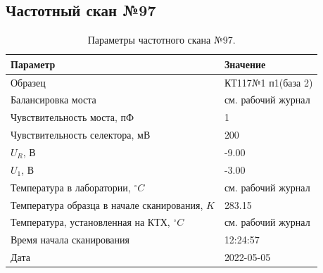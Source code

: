 \subsection{Частотный скан №97}
\begin{table}[!ht]
    \centering
    \caption{Параметры частотного скана №97.}
    \begin{tabular}{|l|l|}
        \hline
        Параметр                                       & Значение                  \\ \hline
        Образец                                        & КТ117№1 п1(база 2)        \\ \hline
        Балансировка моста                             & см. рабочий журнал        \\ \hline
        Чувствительность моста, пФ                     & 1                         \\ \hline
        Чувствительность селектора, мВ                 & 200                       \\ \hline
        $U_R$, В                                       & -9.00                     \\ \hline
        $U_1$, В                                       & -3.00                     \\ \hline
        Температура в лаборатории, $^\circ C$          & см. рабочий журнал        \\ \hline
        Температура образца в начале сканирования, $K$ & 283.15                    \\ \hline
        Температура, установленная на КТХ, $^\circ C$  & см. рабочий журнал        \\ \hline
        Время начала сканирования                      & 12:24:57                  \\ \hline
        Дата                                           & 2022-05-05                \\ \hline
    \end{tabular}
    \label{table:frequency_scan_97}
\end{table}


